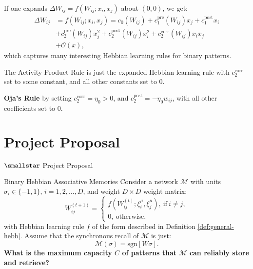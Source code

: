 \documentclass[]{beamer}
\begin{document}
\begin{frame}
  \begin{definition}\label{def:general-hebb}
    If one expands $\Delta W_{ij} = f(W_{ij}; x_i, x_j)$ about $(0, 0)$, we get:
    \begin{align*}
      \Delta W_{ij} &= f(W_{ij}; x_i, x_j) =
      c_0 (W_{ij}) + c_1^\text{pre} (W_{ij}) x_j + c_1^\text{post} x_i \\
      &+ c_2^\text{pre} (W_{ij}) x_j^2 + c_2^\text{post} (W_{ij}) x_i^2
      + c_2^\text{corr} (W_{ij}) x_i x_j \\
      &+ \mathcal{O} (x),
    \end{align*}
    which captures many interesting Hebbian learning rules for binary patterns.
  \end{definition}
  \begin{example}
    The Activity Product Rule is
    just the expanded Hebbian learning rule with $c_2^\text{corr}$
    set to some constant, and all other constants set to $0$.
  \end{example}

  \begin{example}
    \textbf{Oja's Rule} \parencite{oja_simplified_1982}
    by setting $c_2^\text{corr} = \eta_0 > 0$,
    and $c_2^\text{post} = - \eta_0 w_{ij}$, with all other
    coefficients set to $0$.
  \end{example}
\end{frame}

\section{Project Proposal}

\begin{frame}{$\smallstar$ Project Proposal}
  \begin{block}{Binary Hebbian Associative Memories}
    Consider a network $\mathcal{M}$ with units $\sigma_i \in \{-1,
    1\}$, $i = 1, 2, \dots, D$,
    and weight $D \times D$ weight matrix:
    $$
    W_{ij}^{(t+1)} =
    \begin{cases}
      f(W_{ij}^{(t)}; \xi^\mu_i, \xi^\mu_j),~\text{if}~i \neq j, \\
      0,~\text{otherwise},
    \end{cases}
    $$
    with Hebbian learning rule $f$ of the form
    described in Definition \ref{def:general-hebb}. Assume
    that the synchronous recall of $\mathcal{M}$ is just:
    $$
    \mathcal{M}(\sigma) = \text{sgn} \left[ W \sigma \right].
    $$
    \textbf{What is the maximum capacity $C$ of patterns that
    $\mathcal{M}$ can reliably store and retrieve?}
  \end{block}
\end{frame}
\end{document}
